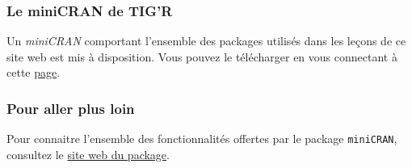 \documentclass[
  letterpaper,
  DIV=11,
  numbers=noendperiod]{scrartcl}
\begin{document}
\hypertarget{le-minicran-de-tigr}{%
\subsubsection{Le miniCRAN de TIG'R}\label{le-minicran-de-tigr}}

Un \emph{miniCRAN} comportant l'ensemble des packages utilisés dans les
leçons de ce site web est mis à disposition. Vous pouvez le télécharger
en vous connectant à cette \href{https://bit.ly/3X1L4lk}{page}.

\hypertarget{pour-aller-plus-loin}{%
\subsubsection{Pour aller plus loin}\label{pour-aller-plus-loin}}

Pour connaitre l'ensemble des fonctionnalités offertes par le package
\texttt{miniCRAN}, consultez le
\href{http://andrie.github.io/miniCRAN/index.html}{site web du package}.

\hfill\break
\hfill\break
\end{document}
